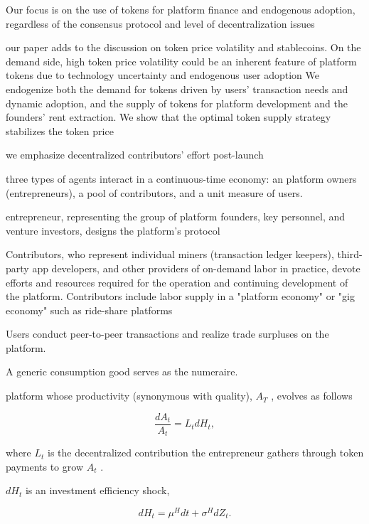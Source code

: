 {Our focus is on the use of tokens for platform finance and endogenous adoption, regardless of the consensus protocol and level of decentralization issues

our paper adds to the discussion on token price volatility and stablecoins. On the demand side, high token price volatility could be an inherent feature of platform tokens due to technology uncertainty and endogenous user adoption We endogenize both the demand for tokens driven by users' transaction needs and dynamic adoption, and the supply of tokens for platform development and the founders' rent extraction. We show that the optimal token supply strategy stabilizes the token price

we emphasize decentralized contributors' effort post-launch

three types of agents interact in a continuous-time economy: an platform owners (entrepreneurs), a pool of contributors, and a unit measure of users.

entrepreneur, representing the group of platform founders, key personnel, and venture investors, designs the platform's protocol

Contributors, who represent individual miners (transaction ledger keepers), third-party app developers, and other providers of on-demand labor in practice, devote efforts and resources required for the operation and continuing development of the platform. Contributors include labor supply in a "platform economy" or "gig economy" such as ride-share platforms

Users conduct peer-to-peer transactions and realize trade surpluses on the platform.

A generic consumption good serves as the numeraire.

platform whose productivity (synonymous with quality), $A_T$ , evolves as follows 

\begin{equation} 

\frac{d A_{t}}{A_{t}}=L_{t}d H_{t}, 

\end{equation} 

where $L_t$ is the decentralized contribution the entrepreneur gathers through token payments to grow $A_t$ .

$d H_t$ is an investment efficiency shock, 

\begin{equation} 

d H_{t}=\mu^{H}d t+\sigma^{H}d Z_{t}. 


\end{equation}}

